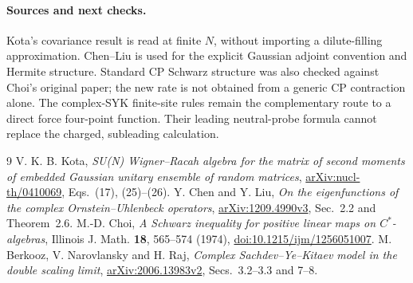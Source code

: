\documentclass[11pt,a4paper]{article}
\begin{document}
\paragraph{Sources and next checks.}
Kota's covariance result is read at finite $N$, without importing a
dilute-filling approximation. Chen--Liu is used for the explicit
Gaussian adjoint convention and Hermite structure. Standard CP
Schwarz structure was also checked against Choi's original paper;
the new rate is not obtained from a generic CP contraction alone.
The complex-SYK finite-site rules remain the complementary route
to a direct force four-point function. Their leading neutral-probe
formula cannot replace the charged, subleading calculation.

\begin{thebibliography}{9}
 V. K. B. Kota,
\emph{SU(N) Wigner--Racah algebra for the matrix of second moments
of embedded Gaussian unitary ensemble of random matrices},
\href{https://arxiv.org/abs/nucl-th/0410069}{arXiv:nucl-th/0410069},
Eqs.~(17), (25)--(26).
 Y. Chen and Y. Liu,
\emph{On the eigenfunctions of the complex Ornstein--Uhlenbeck operators},
\href{https://arxiv.org/abs/1209.4990}{arXiv:1209.4990v3},
Sec.~2.2 and Theorem~2.6.
 M.-D. Choi,
\emph{A Schwarz inequality for positive linear maps on $C^*$-algebras},
Illinois J. Math. \textbf{18}, 565--574 (1974),
\href{https://doi.org/10.1215/ijm/1256051007}{doi:10.1215/ijm/1256051007}.
 M. Berkooz, V. Narovlansky and H. Raj,
\emph{Complex Sachdev--Ye--Kitaev model in the double scaling limit},
\href{https://arxiv.org/abs/2006.13983}{arXiv:2006.13983v2},
Secs.~3.2--3.3 and 7--8.
\end{thebibliography}
\end{document}
